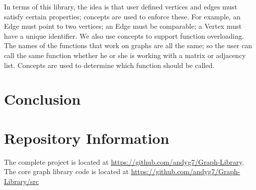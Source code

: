 \documentclass{article}
\begin{document}
In terms of this library, the idea is that user defined vertices and edges must satisfy certain properties; concepts are used to enforce these. For example, an Edge must point to two vertices; an Edge must be comparable; a Vertex must have a unique identifier. We also use concepts to support function overloading. The names of the functions that work on graphs are all the same; so the user can call the same function whether he or she is working with a matrix or adjacency list. Concepts are used to determine which function should be called.

\section{Conclusion}

\section{Repository Information}
The complete project is located at \url{https://github.com/andyg7/Graph-Library}.
The core graph library code is located at \url{https://github.com/andyg7/Graph-Library/src}
\end{document}
